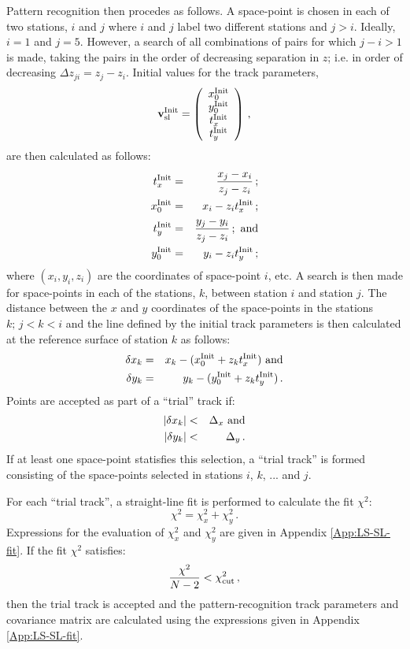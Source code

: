 Pattern recognition then procedes as follows.
A space-point is chosen in each of two stations, $i$ and $j$ where $i$
and $j$ label two different stations and $j>i$.
Ideally, $i=1$ and $j=5$.
However, a search of all combinations of pairs for which $j-i>1$ is
made, taking the pairs in the order of decreasing separation in $z$;
i.e. in order of decreasing $\Delta z_{ji} = z_j - z_i$. 
Initial values for the track parameters,
\begin{equation}
 {\bf v_{\rm sl}^{\rm Init}} =
 \left( 
   \begin{array}{c}
     x_0^{\rm Init} \\
     y_0^{\rm Init} \\
     t_x^{\rm Init} \\
     t_y^{\rm Init}
   \end{array}
 \right)\,,
\end{equation}
are then calculated as follows:
\begin{eqnarray}
  t_x^{\rm Init} & = & \frac{x_j - x_i}{z_j - z_i} \,;        \\
  x_0^{\rm Init} & = & x_i - z_i t_x^{\rm Init}      \,;        \\
  t_y^{\rm Init} & = & \frac{y_j - y_i}{z_j - z_i} \,; {\rm~and} \\
  y_0^{\rm Init} & = & y_i - z_i t_y^{\rm Init} \,;
\end{eqnarray}
where $(x_i, y_i, z_i)$ are the coordinates of space-point $i$, etc.
A search is then made for space-points in each of the stations, $k$,
between station $i$ and station $j$.
The distance between the $x$ and $y$ coordinates of the space-points
in the stations $k;\,j<k<i$ and the line defined by the initial track
parameters is then calculated at the reference surface of station $k$
as follows:
\begin{eqnarray}
  \delta x_k & = & x_k - (x_0^{\rm Init} + z_k t_x^{\rm Init}) {\rm~and} \\
  \delta y_k & = & y_k - (y_0^{\rm Init} + z_k t_y^{\rm Init}) \,.
\end{eqnarray}
Points are accepted as part of a ``trial'' track if:
\begin{eqnarray}
  | \delta x_k | & < & \Delta_x {\rm~and} \\
  | \delta y_k | & < & \Delta_y \,.
\end{eqnarray}
If at least one space-point statisfies this selection, a ``trial track''
is formed consisting of the space-points selected in stations 
$i$, $k$, ... and $j$.

For each ``trial track'', a straight-line fit is performed to
calculate the fit $\chi^2$:
\begin{equation}
  \chi^2 = \chi_x^2 + \chi_y^2 \,.
\end{equation}
Expressions for the evaluation of $\chi^2_x$ and $\chi^2_y$ are given
in Appendix \ref{App:LS-SL-fit}.
If the fit $\chi^2$ satisfies:
\begin{equation}
  \frac{\chi^2}{N-2} < \chi^2_{\rm cut} \,,
\end{equation}
then the trial track is accepted and the pattern-recognition track
parameters and covariance matrix are calculated using the expressions
given in Appendix \ref{App:LS-SL-fit}.
